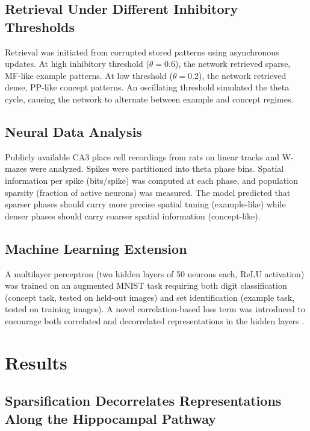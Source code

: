 \documentclass[11pt]{article}
\begin{document}
\subsection{Retrieval Under Different Inhibitory Thresholds}

Retrieval was initiated from corrupted stored patterns using asynchronous updates. At high inhibitory threshold ($\theta = 0.6$), the network retrieved sparse, MF-like example patterns. At low threshold ($\theta = 0.2$), the network retrieved dense, PP-like concept patterns. An oscillating threshold simulated the theta cycle, causing the network to alternate between example and concept regimes.

\subsection{Neural Data Analysis}

Publicly available CA3 place cell recordings from rats on linear tracks and W-mazes were analyzed. Spikes were partitioned into theta phase bins. Spatial information per spike (bits/spike) was computed at each phase, and population sparsity (fraction of active neurons) was measured. The model predicted that sparser phases should carry more precise spatial tuning (example-like) while denser phases should carry coarser spatial information (concept-like).

\subsection{Machine Learning Extension}

A multilayer perceptron (two hidden layers of 50 neurons each, ReLU activation) was trained on an augmented MNIST task requiring both digit classification (concept task, tested on held-out images) and set identification (example task, tested on training images). A novel correlation-based loss term was introduced to encourage both correlated and decorrelated representations in the hidden layers \citep{ruder2017overview}.

\section{Results}

\subsection{Sparsification Decorrelates Representations Along the Hippocampal Pathway}
\end{document}
